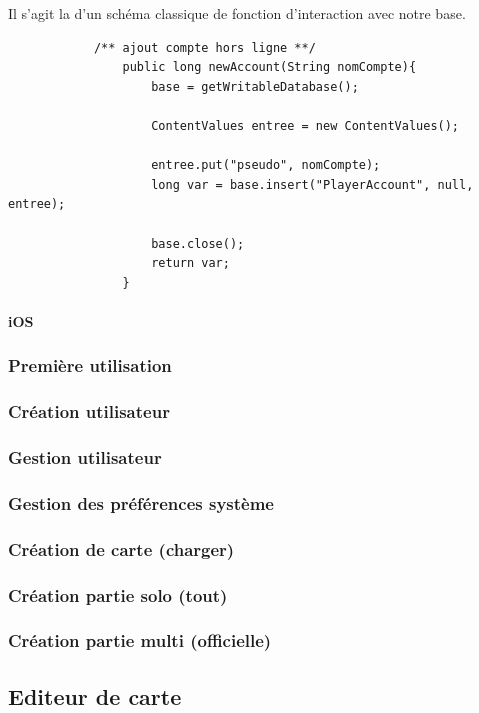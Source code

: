 \documentclass[a4paper,11pt]{report}
\begin{document}
			Il s'agit la d'un schéma classique de fonction d'interaction avec notre
			base.
						
			\begin{verbatim}
			/** ajout compte hors ligne **/
				public long newAccount(String nomCompte){
					base = getWritableDatabase();
			
					ContentValues entree = new ContentValues();
					
					entree.put("pseudo", nomCompte);
					long var = base.insert("PlayerAccount", null, entree);
					
					base.close();
					return var;
				}
			\end{verbatim}

			
			\paragraph{iOS}
				
			\subsubsection{Première utilisation}
			\subsubsection{Création utilisateur}
			\subsubsection{Gestion utilisateur}
			\subsubsection{Gestion des préférences système}
			\subsubsection{Création de carte (charger)}
			\subsubsection{Création partie solo (tout)}
			\subsubsection{Création partie multi (officielle)}
			
		\subsection{Editeur de carte}
\end{document}
